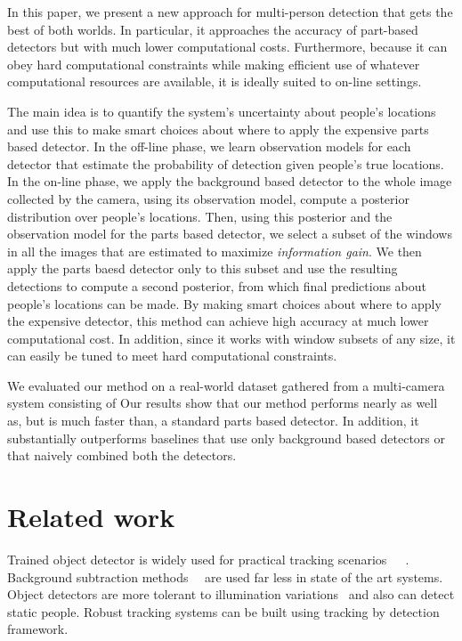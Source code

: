 \documentclass[10pt,twocolumn,letterpaper]{article}
\begin{document}
In this paper, we present a new approach for multi-person detection that gets the best of both worlds.  In particular, it approaches the accuracy of part-based detectors but with much lower computational costs.  Furthermore, because it can obey hard computational constraints while making efficient use of whatever computational resources are available, it is ideally suited to on-line settings.

The main idea is to quantify the system's uncertainty about people's locations and use this to make smart choices about where to apply the expensive parts based detector.  In the off-line phase, we learn observation models for each detector that estimate the probability of detection given people's true locations.  In the on-line phase, we apply the background based detector to the whole image collected by the camera, using its observation model, compute a posterior distribution over people's locations.  Then, using this posterior and the observation model for the parts based detector, we select a subset of the windows in all the images that are estimated to maximize \emph{information gain}.  We then apply the parts baesd detector only to this subset and use the resulting detections to compute a second posterior, from which final predictions about people's locations can be made.  By making smart choices about where to apply the expensive detector, this method can achieve high accuracy at much lower computational cost.  In addition, since it works with window subsets of any size, it can easily be tuned to meet hard computational constraints.  

We evaluated our method on a real-world dataset gathered from a multi-camera system consisting of   Our results show that our method performs nearly as well as, but is much faster than, a standard parts based detector.  In addition, it substantially outperforms baselines that use only background based detectors or that naively combined both the detectors.

\section {Related work} 

Trained object detector is widely used for practical tracking scenarios~\cite{Pami-11}~\cite{POM-main}~\cite{MIL-obj1}. Background subtraction methods~\cite{bk1}~\cite{bk2-bayesian} are used far less in state of the art systems. Object detectors are more tolerant to illumination variations~\cite{ObjDet-1} and also can detect static people. Robust tracking systems can be built using  tracking by detection framework.
\end{document}
